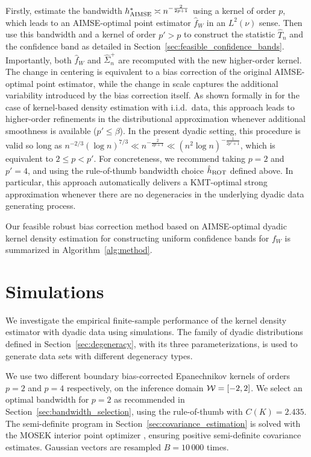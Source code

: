 Firstly, estimate the bandwidth $h^*_{\operatorname{AIMSE}}\asymp n^{-\frac{2}{2p+1}}$ using a
kernel of order $p$, which leads to an AIMSE-optimal point estimator
$\hat{f}_W$ in an $L^2(\nu)$ sense. Then use this bandwidth and a kernel of
order $p' > p$ to construct the statistic $\hat T_n$ and the confidence band as
detailed in Section~\ref{sec:feasible_confidence_bands}. Importantly, both
$\hat{f}_W$ and $\hat{\Sigma}^+_n$ are recomputed with the new higher-order
kernel. The change in centering is equivalent to a bias correction of the
original AIMSE-optimal point estimator, while the change in scale captures the
additional variability introduced by the bias correction itself. As shown
formally in \citet{calonico2018effect, calonico2022coverage} for the case of
kernel-based density
estimation with i.i.d.\ data, this approach leads to higher-order refinements
in the distributional approximation whenever additional smoothness is available
($p'\leq\beta$). In the present dyadic setting, this procedure is valid so long
as $n^{-2/3} (\log n)^{7/3} \ll n^{-\frac{2}{2p+1}}
\ll (n^2 \log n)^{-\frac{1}{2p' + 1}}$,
which is equivalent to $2 \leq p < p'$.
For concreteness, we recommend taking $p = 2$ and $p' = 4$,
and using the rule-of-thumb bandwidth choice $\hat{h}_{\operatorname{ROT}}$ defined above.
In particular, this approach automatically delivers a KMT-optimal
strong approximation whenever there are no degeneracies in the
underlying dyadic data generating process.

Our feasible robust bias correction method based on AIMSE-optimal dyadic
kernel density estimation for constructing uniform confidence bands
for $f_W$ is summarized in Algorithm~\ref{alg:method}.

\section{Simulations}
\label{sec:simulations}

We investigate the empirical finite-sample performance of the kernel density
estimator with dyadic data using simulations. The family of dyadic
distributions defined in Section~\ref{sec:degeneracy}, with its three
parameterizations, is used to generate data sets with different degeneracy
types.

We use two different boundary bias-corrected Epanechnikov kernels of orders
$p=2$ and $p=4$ respectively, on the inference domain $\mathcal{W} = [-2,2]$. We select
an optimal bandwidth for $p=2$ as recommended in
Section~\ref{sec:bandwidth_selection}, using the rule-of-thumb with
$C(K) = 2.435$. The semi-definite program in
Section~\ref{sec:covariance_estimation} is solved with the MOSEK interior point
optimizer \citep{mosek}, ensuring positive semi-definite covariance estimates.
Gaussian vectors are resampled $B = 10\,000$ times.


